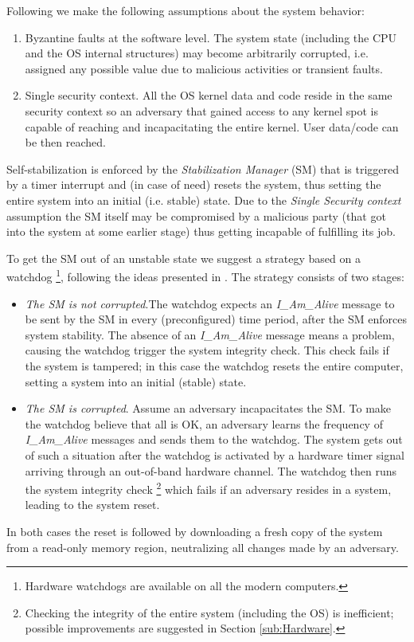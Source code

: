 Following \cite{4553720} we make the following assumptions about
the system behavior:
\begin{enumerate}
\item Byzantine faults at the software level. The system state (including
the CPU and the OS internal structures) may become arbitrarily corrupted,
i.e. assigned any possible value due to malicious activities or transient
faults.
\item Single security context. All the OS kernel data and code reside in
the same security context so an adversary that gained access to any
kernel spot is capable of reaching and incapacitating the entire kernel.
User data/code can be then reached.
\end{enumerate}
Self-stabilization is enforced by the \textit{Stabilization Manager}
(SM) that is triggered by a timer interrupt and (in case of need)
resets the system, thus setting the entire system into an initial
(i.e. stable) state. Due to the \textit{Single Security context} assumption
the SM itself may be compromised by a malicious party (that got into
the system at some earlier stage) thus getting incapable of fulfilling
its job. 

To get the SM out of an unstable state we suggest a strategy based
on a watchdog%
\footnote{Hardware watchdogs are available on all the modern computers.%
}, following the ideas presented in \cite{4553720}. The strategy consists
of two stages: 
\begin{itemize}
\item \textit{The SM is not corrupted}.The watchdog expects an \textit{I\_Am\_Alive}
message to be sent by the SM in every (preconfigured) time period,
after the SM enforces system stability. The absence of an \textit{I\_Am\_Alive}
message means a problem, causing the watchdog trigger the system integrity
check. This check fails if the system is tampered; in this case the
watchdog resets the entire computer, setting a system into an initial
(stable) state. 
\item \textit{The SM is corrupted}. Assume an adversary incapacitates the
SM. To make the watchdog believe that all is OK, an adversary learns
the frequency of \textit{I\_Am\_Alive} messages and sends them to
the watchdog. The system gets out of such a situation after the watchdog
is activated by a hardware timer signal arriving through an out-of-band
hardware channel. The watchdog then runs the system integrity check%
\footnote{Checking the integrity of the entire system (including the OS) is
inefficient; possible improvements are suggested in Section \ref{sub:Hardware}.%
} which fails if an adversary resides in a system, leading to the system
reset. 
\end{itemize}
In both cases the reset is followed by downloading a fresh copy of
the system from a read-only memory region, neutralizing all changes
made by an adversary. 

